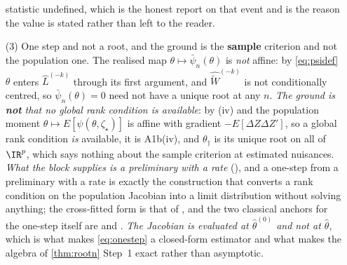 \begin{remark}
\begin{enumerate}
statistic undefined, which is the honest report on that event and is the reason the value is stated rather
than left to the reader.
\item[(3)] One step and not a root, and the ground is the \textbf{sample} criterion and not the
population one. The realised map
$\theta\mapsto\bar\psi_n(\theta)$ is \emph{not} affine: by \eqref{eq:psidef} $\theta$ enters
$\hat L^{(-k)}$ through its first argument, and $\widehat{\widetilde W}^{(-k)}$ is not conditionally
centred, so $\bar\psi_n(\theta)=0$ need not have a unique root at any $n$. \emph{The ground is
\textbf{not} that no global rank condition is available}: by \textup{(iv)} and
 the
population moment $\theta\mapsto E[\psi(\theta,\zeta_\star)]$ is affine with gradient $-E[\Delta Z\Delta Z']$,
so a global rank condition \emph{is} available, it is A1b(iv), and $\theta_\dagger$ is its unique root on
all of $\IR^{p}$, which says nothing about the sample criterion at estimated nuisances.
\emph{What the block supplies is a preliminary with a
rate} (), and a one-step from a preliminary with a rate is exactly the construction
that converts a rank condition on the population Jacobian into a limit distribution without solving
anything; the cross-fitted form is that of
\citet{chernozhukov2018dml}, and the two classical anchors for the one-step itself are
\citet[\S3.4]{newey1994h} and \citet[Ch.~5]{vandervaart1998}. \emph{The Jacobian is
evaluated at $\hat\theta^{(0)}$ and not at $\hat\theta$}, which is what makes \eqref{eq:onestep} a closed-form
estimator and what makes the algebra of \cref{thm:rootn} Step~1 exact rather than asymptotic.
\end{enumerate}
\end{remark}
